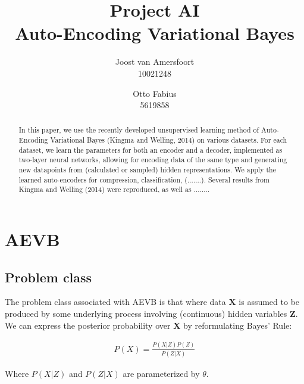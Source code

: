 \documentclass{article}
\begin{document}
\title{Project AI \\ Auto-Encoding Variational Bayes}
\author{	
	Joost van Amersfoort \\ 10021248  
	\and
	Otto Fabius \\ 5619858
	}
\maketitle

\begin{abstract}
In this paper, we use the recently developed unsupervised learning method of Auto-Encoding Variational Bayes (Kingma and Welling, 2014) on various datasets. For each dataset, we learn the parameters for both an encoder and a decoder, implemented as two-layer neural networks, allowing for encoding data of the same type and generating new datapoints from (calculated or sampled) hidden representations. We apply the learned auto-encoders for compression, classification, (.......). Several results from Kingma and Welling (2014) were reproduced, as well as ........
\end{abstract}

\section{AEVB}

\subsection*{Problem class}

The problem class associated with AEVB is that where data $\mathbf{X}$ is assumed to be produced by some underlying process involving (continuous) hidden variables $\mathbf{Z}$. We can express the posterior probability over $\mathbf{X}$ by reformulating Bayes' Rule:

\begin{align}
P(X) = \frac{P(X|Z)P(Z)}{P(Z|X)}
\end{align}

Where $P(X|Z)$ and $P(Z|X)$ are parameterized by $\theta$.
\\
\end{document}
